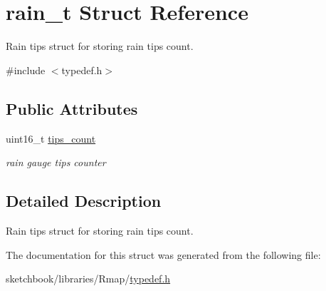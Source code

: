 \hypertarget{structrain__t}{}\section{rain\+\_\+t Struct Reference}
\label{structrain__t}


Rain tips struct for storing rain tips count.  




{\ttfamily \#include $<$typedef.\+h$>$}

\subsection*{Public Attributes}
\begin{DoxyCompactItemize}
\item 
\mbox{\label{structrain__t_acf83576eaf0a965cfacfcd77c1734e40}} 
uint16\+\_\+t \hyperlink{structrain__t_acf83576eaf0a965cfacfcd77c1734e40}{tips\+\_\+count}
\begin{DoxyCompactList}\small\item\em rain gauge tips counter \end{DoxyCompactList}\end{DoxyCompactItemize}


\subsection{Detailed Description}
Rain tips struct for storing rain tips count. 

The documentation for this struct was generated from the following file\+:\begin{DoxyCompactItemize}
\item 
sketchbook/libraries/\+Rmap/\hyperlink{typedef_8h}{typedef.\+h}\end{DoxyCompactItemize}
